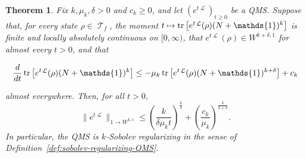 \documentclass[11pt]{article}
\theoremstyle{myplain}
\newtheorem{thm}{Theorem}[section]
\theoremstyle{mydefinition}
\theoremstyle{remark}
\DeclareMathOperator{\cL}{\mathcal{L}}
\DeclareMathOperator{\cT}{\mathcal{T}}
\DeclareMathOperator{\1}{\mathds{1}}
\newcommand{\tr}[1][]{\operatorname{tr}%
  \ifx#1\empty \else \left[ #1 \right] \fi}
\begin{document}
        \begin{thm}\label{thm:sobolev-regularization}
            Fix $k,\mu_k,\delta>0$ and $c_k\geq0$, and let $(e^{t\cL})_{t\geq0}$ be a QMS. Suppose that, for every state $\rho\in\cT_f$, the moment $t\mapsto\tr[e^{t\cL}(\rho)(N+\1)^k]$ is finite and locally absolutely continuous on $[0,\infty)$, that $e^{t\cL}(\rho)\in W^{k+\delta,1}$ for almost every $t>0$, and that
            
            \begin{equation}\label{eq:differential-moment-inequality}
                \frac{d}{dt}\tr[e^{t\cL}(\rho)(N+\1)^k]
                \leq-\mu_k\tr[e^{t\cL}(\rho)(N+\1)^{k+\delta}]+c_k
            \end{equation}
            
            almost everywhere. Then, for all $t > 0$,
            \begin{equation}\label{eq:sobolev-regularization-bound}
                \| e^{t \cL} \|_{1 \to W^{k,1}} \le \left( \frac{k}{\delta \mu_k t} \right)^{\frac{k}{\delta}} + \left( \frac{c_k}{\mu_k} \right)^{\frac{k}{k + \delta}} .
            \end{equation}
            In particular, the QMS is $k$-Sobolev regularizing in the sense of Definition~\ref{def:sobolev-regularizing-QMS}.
        \end{thm}
\end{document}

